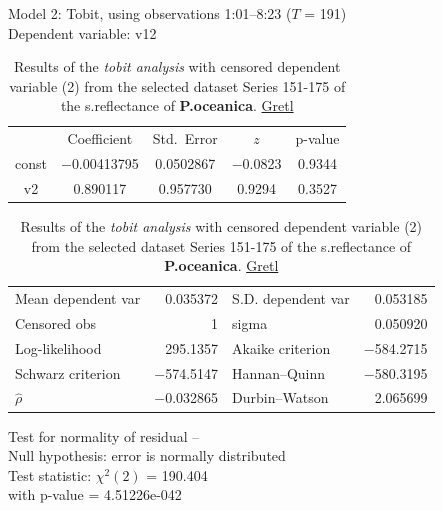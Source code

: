 \documentclass[10pt, a4paper]{article}
\begin{document}
\begin{appendices}
\begin{table}[H]
	\begin{center}
		\caption{Results of the \textit{tobit analysis} with censored dependent variable (2) from the selected dataset Series 151-175 of the s.reflectance of \textbf{P.oceanica}. \href{http://gretl.sourceforge.net/}{Gretl}}
			Model 2: Tobit, using observations 1:01--8:23 ($T$ = 191)\\
			Dependent variable: v12\\
		\vspace{1em}
	\begin{tabular}{|c c c c c|}
		  &  {Coefficient} &    {Std.\ Error} & {$z$} & {p-value} \\[1ex]
		const &   $-$0.00413795 &     0.0502867 &     $-$0.0823 &         0.9344 \\
		v2 &   0.890117 &     0.957730 &       0.9294 &         0.3527 \\
	\end{tabular}

	\vspace{1ex}
	\begin{tabular}{lrlr}
		Mean dependent var &  0.035372 & S.D. dependent var &  0.053185 \\
		Censored obs &         1 & sigma &  0.050920 \\
		Log-likelihood &  295.1357 & Akaike criterion & $-$584.2715 \\
		Schwarz criterion & $-$574.5147 & Hannan--Quinn & $-$580.3195 \\
		$\hat{\rho}$ & $-$0.032865 & Durbin--Watson &  2.065699 \\
	\end{tabular}

	\vspace{1em}
	\begin{raggedright}
		Test for normality of residual --\\
		\quad Null hypothesis: error is normally distributed\\
		\quad Test statistic: $\chi^2(2)$ = 190.404\\
		\quad with p-value = 4.51226e-042\\
	\vspace{1ex}
	\end{raggedright}
	\label{tab:25}
	\end{center}
\end{table}


\end{appendices}
\end{document}

